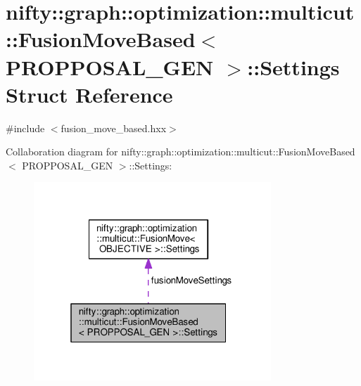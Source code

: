 \hypertarget{structnifty_1_1graph_1_1optimization_1_1multicut_1_1FusionMoveBased_1_1Settings}{}\section{nifty\+:\+:graph\+:\+:optimization\+:\+:multicut\+:\+:Fusion\+Move\+Based$<$ P\+R\+O\+P\+P\+O\+S\+A\+L\+\_\+\+G\+E\+N $>$\+:\+:Settings Struct Reference}
\label{structnifty_1_1graph_1_1optimization_1_1multicut_1_1FusionMoveBased_1_1Settings}


{\ttfamily \#include $<$fusion\+\_\+move\+\_\+based.\+hxx$>$}



Collaboration diagram for nifty\+:\+:graph\+:\+:optimization\+:\+:multicut\+:\+:Fusion\+Move\+Based$<$ P\+R\+O\+P\+P\+O\+S\+A\+L\+\_\+\+G\+E\+N $>$\+:\+:Settings\+:\nopagebreak
\begin{figure}[H]
\begin{center}
\leavevmode
\includegraphics[width=253pt]{structnifty_1_1graph_1_1optimization_1_1multicut_1_1FusionMoveBased_1_1Settings__coll__graph}
\end{center}
\end{figure}
